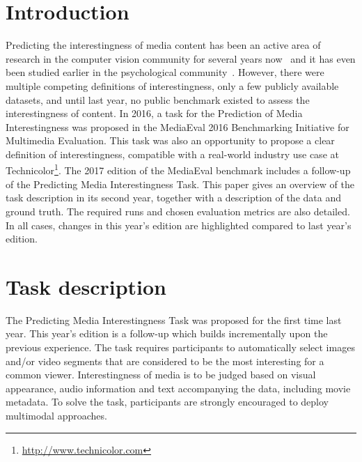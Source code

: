 \documentclass[sigconf]{acmart-me}
\begin{document}
\maketitle

\vspace{-0.2cm}
\section{Introduction}


Predicting the interestingness of media content has been an active area of research in the computer vision community for several years now~\cite{Jiang2013, Gygli2013, Dhar2011, Amengual2015} and it has even been studied earlier in the psychological community~\cite{Berlyne1960, Smith1985, Silvia2006}. However, there were multiple competing definitions of interestingness, only a few publicly available datasets, and until last year, no public benchmark existed to assess the interestingness of content. In 2016, a task for the Prediction of Media Interestingness was proposed in the Media\-Eval 2016 Benchmarking Initiative for Multimedia Evaluation. This task was also an opportunity to propose a clear definition of interestingness, compatible with a real-world industry use case at Technicolor\footnote{\url{http://www.technicolor.com}}. The 2017 edition of the Media\-Eval benchmark includes a follow-up of the Predicting Media Interestingness Task.
This paper gives an overview of the task description in its second year, together with a description of the data and ground truth. The required runs and chosen evaluation metrics are also detailed. In all cases, changes in this year's edition are highlighted compared to last year's edition.


\vspace{-0.2cm}
\section{Task description}

The Predicting Media Interestingness Task was proposed for the first time last year. This year's edition is a follow-up which builds incrementally upon the previous experience. The task requires participants to automatically select images and/or video segments that are considered to be the most interesting for a common viewer. Interestingness of media is to be judged based on visual appearance, audio information and text accompanying the data, including movie metadata. To solve the task, participants are strongly encouraged to deploy multimodal approaches.
\end{document}
